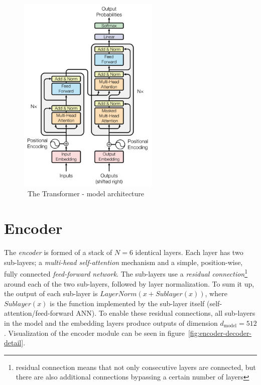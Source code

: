 \begin{figure}
    \centering
    \includegraphics[width=0.6\textwidth]{assets/transformer-overview}
    \caption{~The Transformer - model architecture~\cite{attention-is-all-you-need}}\label{fig:transformer-overview}
\end{figure}


\section{Encoder}\label{sec:encoder}

The \textit{encoder} is formed of a stack of $N = 6$ identical layers.
Each layer has two sub-layers;
a \textit{multi-head self-attention} mechanism and a simple, position-wise, fully connected \textit{feed-forward network}.
The sub-layers use a \textit{residual connection}\footnote{residual connection means that not only consecutive layers are connected, but there are also additional connections bypassing a certain number of layers\cite{residual-connection}} around each of the two sub-layers, followed by layer normalization\cite{layer-normalization}.
To sum it up, the output of each sub-layer is $LayerNorm(x + Sublayer(x))$, where $Sublayer(x)$ is the function implemented by the sub-layer itself (self-attention/feed-forward ANN).
To enable these residual connections, all sub-layers in the model and the embedding layers produce outputs of dimension $d_{\text{model}} = 512$.
Visualization of the encoder module can be seen in figure~\ref{fig:encoder-decoder-detail}.~\cite{attention-is-all-you-need}


